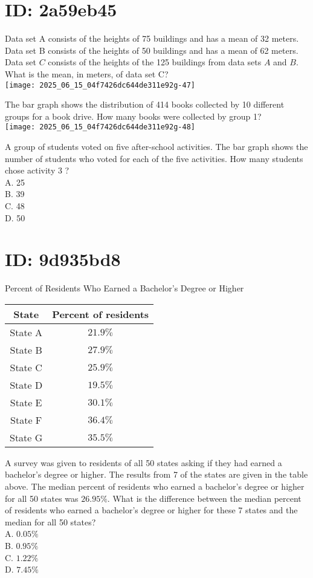 \section*{ID: 2a59eb45}
Data set A consists of the heights of 75 buildings and has a mean of 32 meters. Data set B consists of the heights of 50 buildings and has a mean of 62 meters. Data set $C$ consists of the heights of the 125 buildings from data sets $A$ and $B$. What is the mean, in meters, of data set C?\\
\texttt{[image: 2025\_06\_15\_04f7426dc644de311e92g-47]}

The bar graph shows the distribution of 414 books collected by 10 different groups for a book drive. How many books were collected by group 1?\\
\texttt{[image: 2025\_06\_15\_04f7426dc644de311e92g-48]}

A group of students voted on five after-school activities. The bar graph shows the number of students who voted for each of the five activities. How many students chose activity 3 ?\\
A. 25\\
B. 39\\
C. 48\\
D. 50

\section*{ID: 9d935bd8}
Percent of Residents Who Earned a Bachelor's Degree or Higher

\begin{center}
\begin{tabular}{|c|c|}
\hline
State & Percent of residents \\
\hline
State A & $21.9 \%$ \\
\hline
State B & $27.9 \%$ \\
\hline
State C & $25.9 \%$ \\
\hline
State D & $19.5 \%$ \\
\hline
State E & $30.1 \%$ \\
\hline
State F & $36.4 \%$ \\
\hline
State G & $35.5 \%$ \\
\hline
\end{tabular}
\end{center}

A survey was given to residents of all 50 states asking if they had earned a bachelor's degree or higher. The results from 7 of the states are given in the table above. The median percent of residents who earned a bachelor's degree or higher for all 50 states was $26.95 \%$. What is the difference between the median percent of residents who earned a bachelor's degree or higher for these 7 states and the median for all 50 states?\\
A. $0.05 \%$\\
B. $0.95 \%$\\
C. $1.22 \%$\\
D. $7.45 \%$

